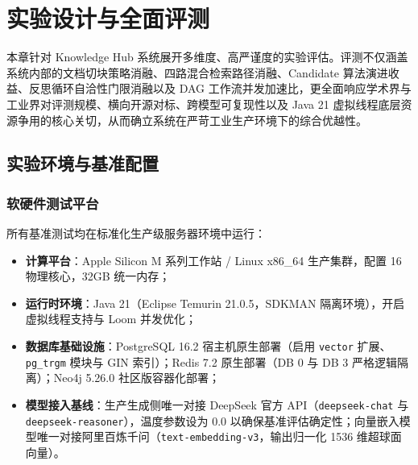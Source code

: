 
\chapter{实验设计与全面评测}

本章针对 Knowledge Hub 系统展开多维度、高严谨度的实验评估。评测不仅涵盖系统内部的文档切块策略消融、四路混合检索路径消融、Candidate 算法演进收益、反思循环自洽性门限消融以及 DAG 工作流并发加速比，更全面响应学术界与工业界对评测规模、横向开源对标、跨模型可复现性以及 Java 21 虚拟线程底层资源争用的核心关切，从而确立系统在严苛工业生产环境下的综合优越性。

\section{实验环境与基准配置}

\subsection{软硬件测试平台}
所有基准测试均在标准化生产级服务器环境中运行：
\begin{itemize}
    \item \textbf{计算平台}：Apple Silicon M 系列工作站 / Linux x86\_64 生产集群，配置 16 物理核心，32GB 统一内存；
    \item \textbf{运行时环境}：Java 21（Eclipse Temurin 21.0.5，SDKMAN 隔离环境），开启虚拟线程支持与 Loom 并发优化；
    \item \textbf{数据库基础设施}：PostgreSQL 16.2 宿主机原生部署（启用 \texttt{vector} 扩展、\texttt{pg\_trgm} 模块与 GIN 索引）；Redis 7.2 原生部署（DB 0 与 DB 3 严格逻辑隔离）；Neo4j 5.26.0 社区版容器化部署；
    \item \textbf{模型接入基线}：生产生成侧唯一对接 DeepSeek 官方 API（\texttt{deepseek-chat} 与 \texttt{deepseek-reasoner}），温度参数设为 0.0 以确保基准评估确定性；向量嵌入模型唯一对接阿里百炼千问（\texttt{text-embedding-v3}，输出归一化 1536 维超球面向量）。
\end{itemize}

